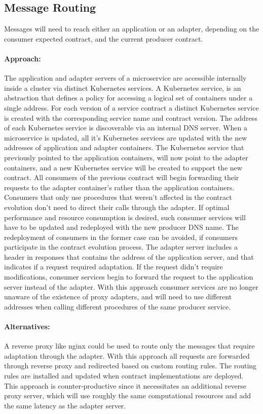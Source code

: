 \subsection{Message Routing} %
\label{sec:message_routing}

Messages will need to reach either an application or an adapter, depending on the consumer expected contract, and the current producer contract.

\paragraph{Approach:}
The application and adapter servers of a microservice are accessible internally inside a cluster via distinct Kubernetes services.
A Kubernetes service, is an abstraction that defines a policy for accessing a logical set of containers under a single address.
For each version of a service contract a distinct Kubernetes service is created with the corresponding service name and contract version.
The address of each Kubernetes service is discoverable via an internal DNS server.
When a microservice is updated, all it's Kubernetes services are updated with the new addresses of application and adapter containers.
The Kubernetes service that previously pointed to the application containers, will now point to the adapter containers, and
a new Kubernetes service will be created to support the new contract.
All consumers of the previous contract will begin forwarding their requests to the adapter container's rather than the application containers.
Consumers that only use procedures that weren't affected in the contract evolution don't need to direct their calls through the adapter.
If optimal performance and resource consumption is desired,
such consumer services will have to be updated and redeployed with the new producer DNS name.
The redeployment of consumers in the former case can be avoided, if consumers participate in the contract evolution process.
The adapter server includes a header in responses that contains the address of the application server, and that indicates if a request required adaptation.
If the request didn't require modifications, consumer services begin to forward the request to the application server instead of the adapter.
With this approach consumer services are no longer unaware of the existence of proxy adapters,
and will need to use different addresses when calling different procedures of the same producer service.

\paragraph{Alternatives:}
A reverse proxy like nginx could be used to route only the messages that require adaptation through the adapter.
With this approach all requests are forwarded through reverse proxy and redirected based on custom routing rules.
The routing rules are installed and updated when contract implementations are deployed.
This approach is counter-productive since it necessitates an additional reverse proxy server,
which will use roughly the same computational resources and add the same latency as the adapter server.

